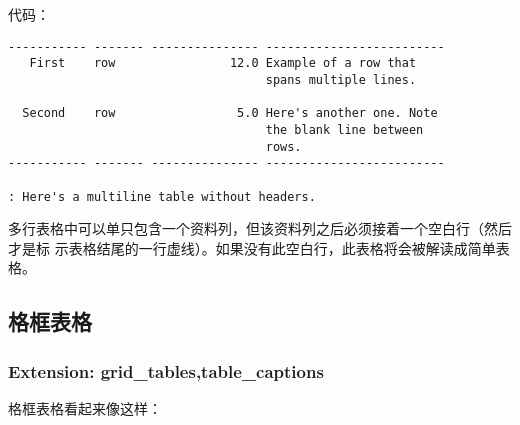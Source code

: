 \documentclass[cn]{elegantbook}
\begin{document}
代码：

\begin{lstlisting}
----------- ------- --------------- -------------------------
   First    row                12.0 Example of a row that
                                    spans multiple lines.

  Second    row                 5.0 Here's another one. Note
                                    the blank line between
                                    rows.
----------- ------- --------------- -------------------------

: Here's a multiline table without headers.
\end{lstlisting}

多行表格中可以单只包含一个资料列，但该资料列之后必须接着一个空白行（然后才是标
示表格结尾的一行虚线）。如果没有此空白行，此表格将会被解读成简单表格。

\hypertarget{ux683cux6846ux8868ux683c}{%
\subsection{格框表格}\label{ux683cux6846ux8868ux683c}}

\hypertarget{extension-grid_tablestable_captions}{%
\subsubsection{Extension:
grid\_tables,table\_captions}\label{extension-grid_tablestable_captions}}

格框表格看起来像这样：
\end{document}
